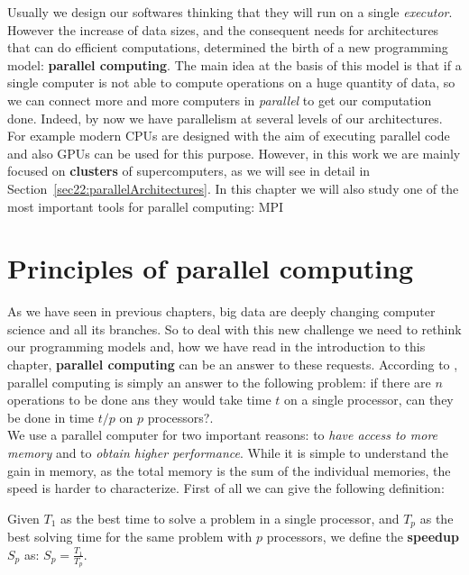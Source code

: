 Usually we design our softwares thinking that they will run on a single \textit{executor}. However the increase of data sizes, and the consequent needs for architectures that can do efficient computations, determined the birth of a new programming model: \textbf{parallel computing}. The main idea at the basis of this model is that if a single computer is not able to compute operations on a huge quantity of data, so we can connect more and more computers in \textit{parallel} to get our computation done. Indeed, by now we have parallelism at several levels of our architectures. For example modern CPUs are designed with the aim of executing parallel code and also GPUs can be used for this purpose. However, in this work we are mainly focused on \textbf{clusters} of supercomputers, as we will see in detail in Section~\ref{sec22:parallelArchitectures}. In this chapter we will also study one of the most important tools for parallel computing: MPI

\section{Principles of parallel computing}\label{sec22:parallelComputing}

As we have seen in previous chapters, big data are deeply changing computer science and all its branches. So to deal with this new challenge we need to rethink our programming models and, how we have read in the introduction to this chapter, \textbf{parallel computing} can be an answer to these requests. According to \cite{Eijkhout}, parallel computing is simply an answer to the following problem: if there are $n$ operations to be done ans they would take time $t$ on a single processor, can they be done in time $t/p$ on $p$ processors?.\\

We use a parallel computer for two important reasons: to \textit{have access to more memory} and to \textit{obtain higher performance}. While it is simple to understand the gain in memory, as the total memory is the sum of the individual memories, the speed is harder to characterize. First of all we can give the following definition:

\begin{definition}[Speedup]
 Given $T_{1}$ as the best time to solve a problem in a single processor, and $T_{p}$ as the best solving time for the same problem with $p$ processors, we define the \textbf{speedup} $S_{p}$ as: $S_{p} = \frac{T_{1}}{T_{p}}$. 
\end{definition}

